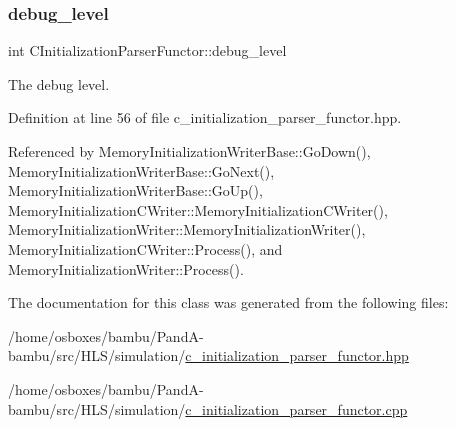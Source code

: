 \subsubsection{\texorpdfstring{debug\+\_\+level}{debug\_level}}
{\footnotesize\ttfamily int C\+Initialization\+Parser\+Functor\+::debug\+\_\+level\hspace{0.3cm}{\ttfamily [protected]}}



The debug level. 



Definition at line 56 of file c\+\_\+initialization\+\_\+parser\+\_\+functor.\+hpp.



Referenced by Memory\+Initialization\+Writer\+Base\+::\+Go\+Down(), Memory\+Initialization\+Writer\+Base\+::\+Go\+Next(), Memory\+Initialization\+Writer\+Base\+::\+Go\+Up(), Memory\+Initialization\+C\+Writer\+::\+Memory\+Initialization\+C\+Writer(), Memory\+Initialization\+Writer\+::\+Memory\+Initialization\+Writer(), Memory\+Initialization\+C\+Writer\+::\+Process(), and Memory\+Initialization\+Writer\+::\+Process().



The documentation for this class was generated from the following files\+:\begin{DoxyCompactItemize}
\item 
/home/osboxes/bambu/\+Pand\+A-\/bambu/src/\+H\+L\+S/simulation/\hyperlink{c__initialization__parser__functor_8hpp}{c\+\_\+initialization\+\_\+parser\+\_\+functor.\+hpp}\item 
/home/osboxes/bambu/\+Pand\+A-\/bambu/src/\+H\+L\+S/simulation/\hyperlink{c__initialization__parser__functor_8cpp}{c\+\_\+initialization\+\_\+parser\+\_\+functor.\+cpp}\end{DoxyCompactItemize}
